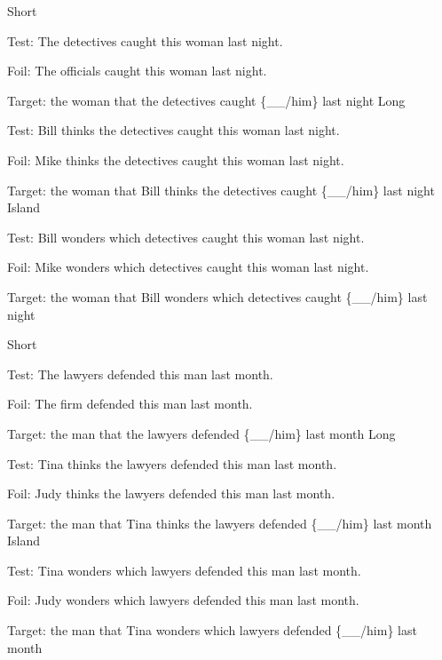 \pex %
\a Short\par\nobreak
Test: The detectives caught this woman last night.\par\nobreak
Foil: The officials caught this woman last night.\par\nobreak
Target: the woman that the detectives caught \{\_\_/him\} last night
\a Long\par\nobreak
Test: Bill thinks the detectives caught this woman last night.\par\nobreak
Foil: Mike thinks the detectives caught this woman last night.\par\nobreak
Target: the woman that Bill thinks the detectives caught \{\_\_/him\} last night
\a Island\par\nobreak
Test: Bill wonders which detectives caught this woman last night.\par\nobreak
Foil: Mike wonders which detectives caught this woman last night.\par\nobreak
Target: the woman that Bill wonders which detectives caught \{\_\_/him\} last night
\xe

\pex %
\a Short\par\nobreak
Test: The lawyers defended this man last month.\par\nobreak
Foil: The firm defended this man last month.\par\nobreak
Target: the man that the lawyers defended \{\_\_/him\} last month
\a Long\par\nobreak
Test: Tina thinks the lawyers defended this man last month.\par\nobreak
Foil: Judy thinks the lawyers defended this man last month.\par\nobreak
Target: the man that Tina thinks the lawyers defended \{\_\_/him\} last month
\a Island\par\nobreak
Test: Tina wonders which lawyers defended this man last month.\par\nobreak
Foil: Judy wonders which lawyers defended this man last month.\par\nobreak
Target: the man that Tina wonders which lawyers defended \{\_\_/him\} last month
\xe

